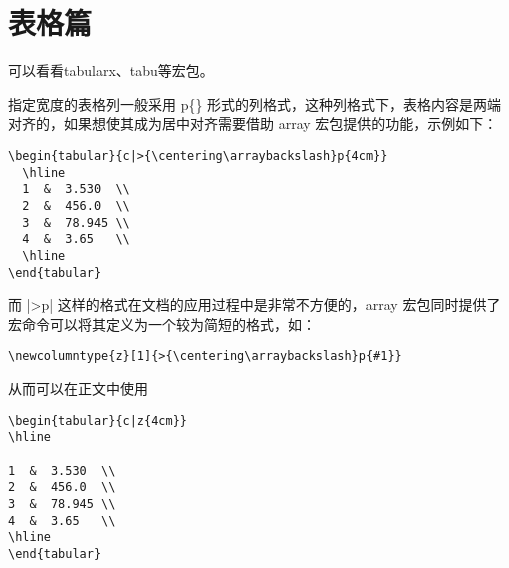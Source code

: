 %
%
%
%

\section{表格篇}



可以看看tabularx、tabu等宏包。



指定宽度的表格列一般采用 p\{\}
形式的列格式，这种列格式下，表格内容是两端对齐的，如果想使其成为居中对齐需要借助
array 宏包提供的功能，示例如下：

\begin{verbatim}
\begin{tabular}{c|>{\centering\arraybackslash}p{4cm}}
  \hline
  1  &  3.530  \\
  2  &  456.0  \\
  3  &  78.945 \\
  4  &  3.65   \\
  \hline
\end{tabular}
\end{verbatim}

而 |>{}p{}|
这样的格式在文档的应用过程中是非常不方便的，array 宏包同时提供了
 宏命令可以将其定义为一个较为简短的格式，如：

\begin{verbatim}
\newcolumntype{z}[1]{>{\centering\arraybackslash}p{#1}}
\end{verbatim}

从而可以在正文中使用

\begin{verbatim}
\begin{tabular}{c|z{4cm}}
\hline

1  &  3.530  \\
2  &  456.0  \\
3  &  78.945 \\
4  &  3.65   \\
\hline
\end{tabular}
\end{verbatim}

